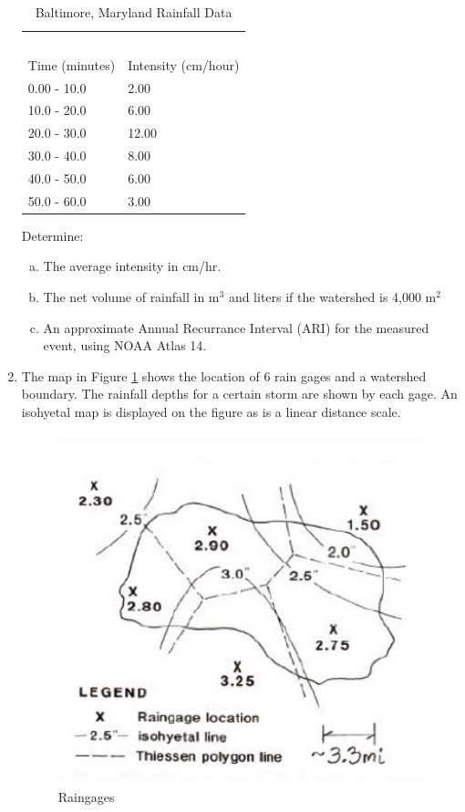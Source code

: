 \documentclass[12pt]{article}
\begin{document}
\begin{enumerate}
\begin{table}[h!]
\centering
\caption{Baltimore, Maryland Rainfall Data}
\begin{tabular}{p{2.0in}p{2.0in}} %
~&~\\
Time (minutes) & Intensity (cm/hour) \\
\hline
\hline
0.00 - 10.0 & 2.00 \\
10.0 - 20.0 & 6.00 \\
20.0 - 30.0 & 12.00 \\
30.0 - 40.0 & 8.00 \\
40.0 - 50.0 & 6.00 \\
50.0 - 60.0 & 3.00 \\
\hline
\end{tabular}
\label{tab:Baltimore}
\end{table}

Determine:
    \begin{enumerate}[a)]
        \item The average intensity in cm/hr.
        \item The net volume of rainfall in m$^3$ and liters if the watershed is 4,000 m$^2$
        \item An approximate Annual Recurrance Interval (ARI) for the measured event, using NOAA Atlas 14. 
    \end{enumerate}
\clearpage
\item The map in Figure \ref{fig:polygonmap} shows the location of 6 rain gages and a watershed boundary. The rainfall depths for a certain storm are shown by each gage. An isohyetal map is displayed on the figure as is a linear distance scale.

\begin{figure}[h!] %
   \centering
   \includegraphics[height=4in]{polygonmap.png} 
   \caption{Raingages}
   \label{fig:polygonmap}
\end{figure}


\end{enumerate}
\end{document}
